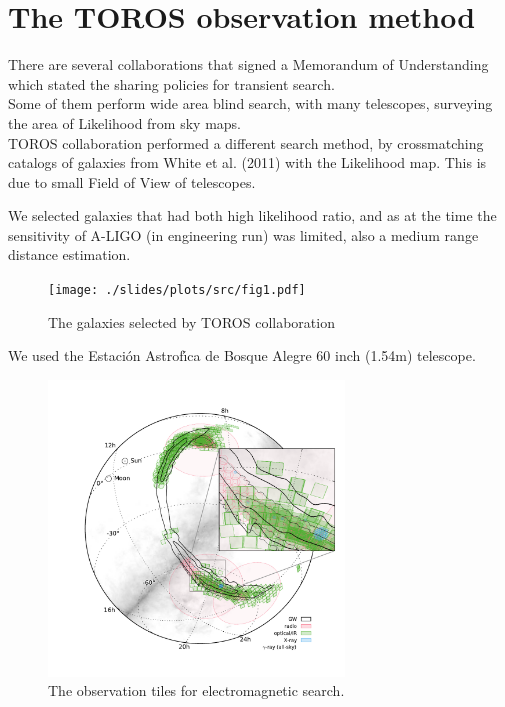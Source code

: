 \documentclass[10pt]{beamer}
\begin{document}
\section{The TOROS observation method}
\begin{frame}
There are several collaborations that signed a Memorandum of Understanding
which stated the sharing policies for transient search.\\
\pause
Some of them perform wide area blind search, with many telescopes, surveying the 
area of Likelihood from sky maps.\\
\pause
TOROS collaboration performed a different search method, by crossmatching 
catalogs of galaxies from White et al. (2011) with the Likelihood map. 
This is due to small Field of View of telescopes.\\
\end{frame}
\begin{frame}
 We selected galaxies that had both high likelihood ratio, and as 
 at the time the sensitivity of A-LIGO (in engineering run) was 
 limited, also a medium range distance estimation.
 
 \begin{figure}
 \centering
 \texttt{[image: ./slides/plots/src/fig1.pdf]}
 \caption{The galaxies selected by TOROS collaboration}
 \label{fig:galaxies selected}
\end{figure}

\end{frame}
\begin{frame}
 We used the Estaci\'on Astrof\'{\i}ca de Bosque Alegre 60 inch (1.54m) telescope. 
 
 \begin{figure}
 \centering
 \includegraphics[width=0.7\textwidth]{./slides/plots/160208492v4/tiles.pdf}
 \caption{The observation tiles for electromagnetic search.}
 \label{fig:tiles}
\end{figure}

 \end{frame}
\end{document}
